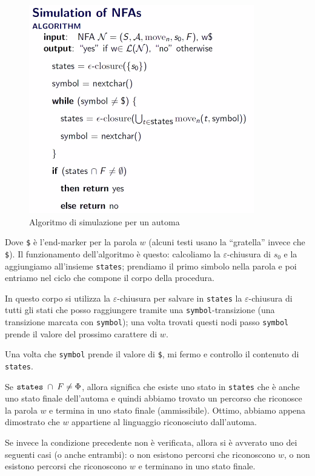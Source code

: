 \documentclass[class=book, crop=false, oneside, 12pt]{standalone}
\begin{document}
\begin{figure}
    \centering
    \includegraphics[width=.6\textwidth,keepaspectratio]{algoritmo_simulazione_nfa}
    \caption{Algoritmo di simulazione per un automa}
    \label{algoritmo_simulazione_nfa}
\end{figure}

Dove \texttt{\$} è l’end-marker per la parola \(w\) (alcuni testi usano la “gratella” invece che \texttt{\$}).
Il funzionamento dell'algoritmo è questo: calcoliamo la \(\varepsilon\)-chiusura di \(s_0\) e la aggiungiamo all'insieme \texttt{states}; prendiamo il primo simbolo nella parola e poi entriamo nel ciclo che compone il corpo della procedura.

In questo corpo si utilizza la \(\varepsilon\)-chiusura per salvare in \texttt{states} la \(\varepsilon\)-chiusura di tutti gli stati che posso raggiungere tramite una \texttt{symbol}-transizione (una transizione marcata con \texttt{symbol}); una volta trovati questi nodi passo \texttt{symbol} prende il valore del prossimo carattere di \(w\).

Una volta che \texttt{symbol} prende il valore di \texttt{\$}, mi fermo e controllo il contenuto di \texttt{states}.

Se \(\textrm{\texttt{states}} \; \cap \; F \neq \Phi\), allora significa che esiste uno stato in \texttt{states} che è anche uno stato finale dell'automa e quindi abbiamo trovato un percorso che riconosce la parola \(w\) e termina in uno stato finale (ammissibile). Ottimo, abbiamo appena dimostrato che \(w\) appartiene al linguaggio riconosciuto dall'automa.

Se invece la condizione precedente non è verificata, allora si è avverato uno dei seguenti casi (o anche entrambi): o non esistono percorsi che riconoscono \(w\), o non esistono percorsi che riconoscono \(w\) e terminano in uno stato finale.
\end{document}

